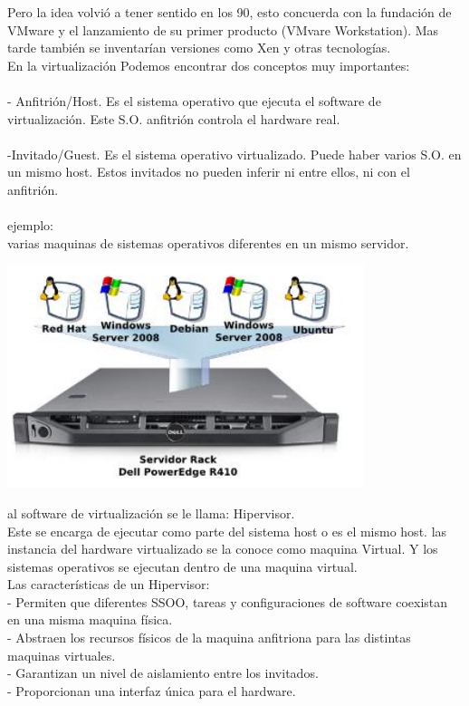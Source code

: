 \documentclass[12pt,letterpaper]{article}
\begin{document}
Pero la idea volvió a tener sentido en los 90, esto concuerda con la fundación de VMware y el lanzamiento de su primer producto (VMvare Workstation). Mas tarde también se inventarían versiones como Xen y otras tecnologías.  \\
En la virtualización Podemos encontrar dos conceptos muy importantes: \\ \\
- Anfitrión/Host. Es el sistema operativo que ejecuta el software de virtualización. Este S.O. anfitrión controla el hardware real. \\ \\
-Invitado/Guest. Es el sistema operativo virtualizado. Puede haber varios S.O. en un mismo host. Estos invitados no pueden inferir ni entre ellos, ni con el anfitrión.   \\ \\
 ejemplo:  \\
 varias maquinas de sistemas operativos diferentes en un mismo servidor.  \\
 		
\begin{center}

\includegraphics[scale=1]{IMAGENES/maquinas.png}  
\end{center}

al software de virtualización se le llama: Hipervisor.  \\
Este se encarga de ejecutar como parte del sistema host o es el mismo host.
las instancia del hardware virtualizado se la conoce como maquina Virtual. Y los sistemas operativos se ejecutan dentro de una maquina virtual.  \\

Las características de un Hipervisor:  \\
- Permiten que diferentes SSOO, tareas y configuraciones de software coexistan en una misma maquina física. \\
- Abstraen los recursos físicos de la maquina anfitriona para las distintas maquinas virtuales. \\
- Garantizan un nivel de aislamiento entre los invitados. \\
- Proporcionan una interfaz única para el hardware. \\
\end{document}

